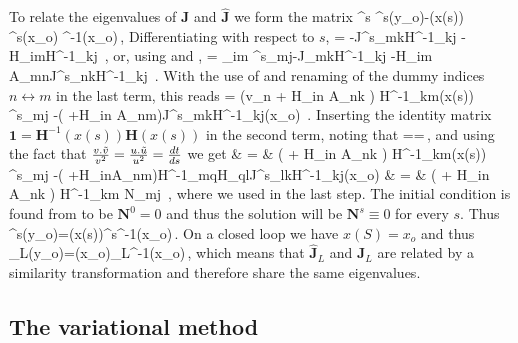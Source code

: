 \documentclass[pre,preprint,groupedaddress,showpacs,showkeys]{revtex4}
\begin{document}
  To relate the eigenvalues of $\mathbf{J}$ and $\mathbf{\hat{J}}$ we form the matrix
  \beq
  	^s \equiv {}^s(y_o)-(x(s)) ^s(x_o) ^{-1}(x_o)\,,
	\label{eq:def:N}
  \eeq
  Differentiating with respect to $s$, 
  \beq
  	  =  -J^s_{mk}H^{-1}_{kj}
						-H_{im}H^{-1}_{kj} \,,
  \eeq
  or, using  and ,
  \beq
	  = \hdtds{}_{im} ^s_{mj}-J_{mk}H^{-1}_{kj}
						-H_{im} \dtds A_{mn}J^s_{nk}H^{-1}_{kj} \,.
  \eeq
  With the use of  and renaming of the dummy indices $n\leftrightarrow m$ in the last term, this reads
  \beq	
	 = \hdtds \left(v_n + H_{in} A_{nk} \right)
				H^{-1}_{km}(x(s)) ^s_{mj} 
				-\left(
						+\dtds H_{in} A_{nm}\right)J^s_{mk}H^{-1}_{kj}(x_o) \,.
  \eeq
  Inserting the identity matrix $\mathbf{1} = \mathbf{H}^{-1}(x(s))\mathbf{H}(x(s))$ in the second term, noting that
  \beq
  	==\,,
  \eeq
  and using the fact that $\frac{v.\tilde{v}}{v^2}=\frac{u.\tilde{u}}{u^2}={\frac{d t}{d s}}$ we get
  \bea
	 & = &  \left(  +  H_{in} A_{nk} \right)
				H^{-1}_{km}(x(s)) ^s_{mj} 
				-\left(
						+H_{in}A_{nm}\right)H^{-1}_{mq}H_{ql}J^s_{lk}H^{-1}_{kj}(x_o) \continue
			& = & \left(  +  H_{in} A_{nk} \right) H^{-1}_{km} N_{mj} \,,
	\label{eq:dNds}
  \eea
  where we used  in the last step.  The initial condition is found from  
  to be $\mathbf{N}^0=0$ and thus the solution will be $\mathbf{N}^s \equiv 0$ for every $s$. Thus
 \beq
 	^s(y_o)=(x(s))^s^{-1}(x_o)\,.
 \eeq  
 On a closed loop we have $x(S)=x_o$ and thus
 \beq
 	_L(y_o)=(x_o)_L^{-1}(x_o)\,,
 \eeq
 which means that $\mathbf{\hat{J}}_L$ and $\mathbf{J}_L$ are related by a similarity transformation and therefore
 share the same eigenvalues. 
  
  

   
    
\subsection{The variational method}
\end{document}
